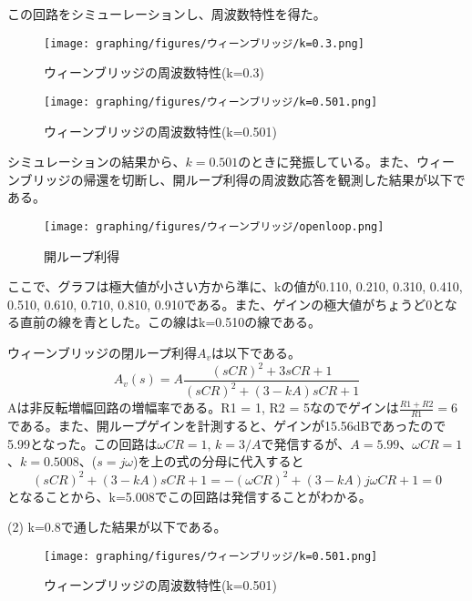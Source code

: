 \documentclass{ltjsarticle}
\begin{document}
この回路をシミューレーションし、周波数特性を得た。

\begin{figure}[H]
    \begin{center}
        \texttt{[image: graphing/figures/ウィーンブリッジ/k=0.3.png]}
        \caption{ウィーンブリッジの周波数特性(k=0.3)}
    \end{center}
\end{figure}

\begin{figure}[H]
    \begin{center}
        \texttt{[image: graphing/figures/ウィーンブリッジ/k=0.501.png]}
        \caption{ウィーンブリッジの周波数特性(k=0.501)}
    \end{center}
\end{figure}

シミュレーションの結果から、$k = 0.501$のときに発振している。また、ウィーンブリッジの帰還を切断し、開ループ利得の周波数応答を観測した結果が以下である。

\begin{figure}[H]
    \begin{center}
        \texttt{[image: graphing/figures/ウィーンブリッジ/openloop.png]}
        \caption{開ループ利得}
    \end{center}
\end{figure}

ここで、グラフは極大値が小さい方から準に、kの値が0.110, 0.210, 0.310, 0.410, 0.510, 0.610, 0.710, 0.810, 0.910である。また、ゲインの極大値がちょうど0となる直前の線を青とした。この線はk=0.510の線である。

ウィーンブリッジの閉ループ利得$A_v$は以下である。
$$
A_v(s) = A\frac{(sCR)^2+3sCR+1}{(sCR)^2+(3-kA)sCR+1} 
$$
Aは非反転増幅回路の増幅率である。R1 = 1, R2 = 5なのでゲインは$\frac{R1+R2}{R1} = 6$である。また、開ループゲインを計測すると、ゲインが15.56dBであったので5.99となった。この回路は$\omega CR = 1$, $k=3/A$で発信するが、$A=5.99$、$\omega CR = 1$、$k=0.5008$、($s=j\omega$)を上の式の分母に代入すると
$$
(sCR)^2 + (3-kA)sCR + 1 = -(\omega CR)^2 + (3-kA)j\omega CR + 1 = 0
$$
となることから、k=5.008でこの回路は発信することがわかる。

(2) 
k=0.8で通した結果が以下である。
\begin{figure}[H]
    \begin{center}
        \texttt{[image: graphing/figures/ウィーンブリッジ/k=0.501.png]}
        \caption{ウィーンブリッジの周波数特性(k=0.501)}
    \end{center}
\end{figure}
\end{document}
